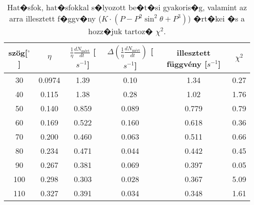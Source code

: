 \begin{table}[h]
\begin{center}
\begin{tabular}{|c|c|c|c|c|c|}
\hline
szög[$^{\circ}$] &  $\eta$ & $\frac{1}{\eta}\frac{dN_{\text{mért}}}{dt}$ [$s^{-1}$] & $\Delta\left(\frac{1}{\eta}\frac{dN_{\text{mért}}}{dt}\right)$ [$s^{-1}$] & illesztett függvény [$s^{-1}$]& $\chi^{2}$ \\
\hline
30 & 0.0974 & 1.39 & 0.10 & 1.34 & 0.27 \\
\hline
40 & 0.115 & 1.38 & 0.28 & 1.02 & 1.76 \\
\hline
50 & 0.140 & 0.859 & 0.089 & 0.779 & 0.79 \\
\hline
60 & 0.169 & 0.522 & 0.160 & 0.618 & 0.36 \\
\hline
70 & 0.200 & 0.460 & 0.063 & 0.511 & 0.66 \\
\hline
80 & 0.234 & 0.471 & 0.044 & 0.442 & 0.45 \\
\hline
90 & 0.267 & 0.381 & 0.069 & 0.397 & 0.05 \\
\hline
100 & 0.298 & 0.303 & 0.028 & 0.367 & 5.09 \\
\hline
110 & 0.327 & 0.391 & 0.034 & 0.348 & 1.61 \\
\hline
\end{tabular}
\end{center}
\caption{Hat�sfok, hat�sfokkal s�lyozott be�t�si gyakoris�g, valamint az arra illesztett f�ggv�ny ($K\cdot (P-P^2\sin^2{\theta}+P^3)$) �rt�kei �s a hozz�juk tartoz� $\chi^2$.}
\label{tab:KN}
\end{table}